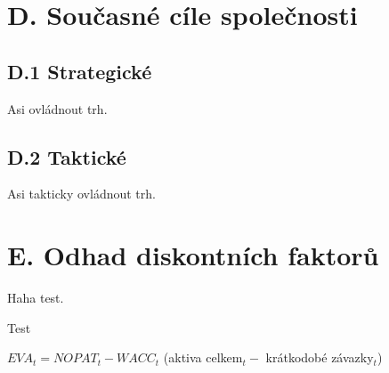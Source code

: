 \section*{D. Současné cíle společnosti}
\label{sec:Soucasne cile spolecnosti}

\subsection*{D.1 Strategické}
\label{sec:Strategicke}

Asi ovládnout trh.

\subsection*{D.2 Taktické}
\label{sec:Takticke}

Asi takticky ovládnout trh.

\section*{E. Odhad diskontních faktorů}
\label{sec:Odhad diskontnich faktoru}

Haha test.

Test 

$EVA_t = NOPAT_t - WACC_t$ (aktiva celkem$_t -$ krátkodobé závazky$_t$)

